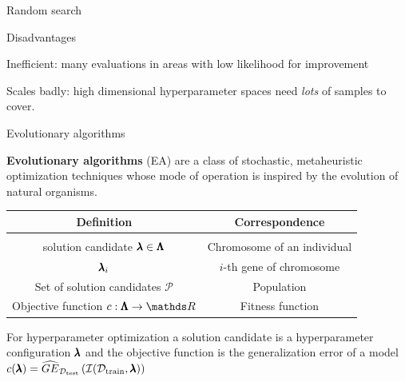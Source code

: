 \begin{frame}{Random search}
\begin{blocki}{Disadvantages}
\item Inefficient: many evaluations in areas with low likelihood for improvement
\item Scales badly: high dimensional hyperparameter spaces need \emph{lots} of samples to cover.
\end{blocki}
\end{frame}





\begin{frame}{Evolutionary algorithms}

\textbf{Evolutionary algorithms} (EA) are a class of stochastic, metaheuristic optimization techniques whose mode of operation is inspired by the evolution of natural organisms.

\vspace{0.5cm}

\begin{center}
\begin{tabular}{ c | c }
\textbf{Definition} & \textbf{Correspondence} \\[0.05cm]
\hline \\[0.01cm]
solution candidate $\pmb{\lambda} \in \pmb{\Lambda}$ & Chromosome of an individual \\[0.1cm]
$\pmb{\lambda}_{i}$& $i$-th gene of chromosome\\[0.1cm]
Set of solution candidates $\mathcal{P}$ & Population \\[0.1cm]
Objective function $\f: \XX \to \R$ & Fitness function
\end{tabular}
\end{center}

For hyperparameter optimization a solution candidate is a hyperparameter configuration $\pmb{\lambda}$ and the objective function is the generalization error of a model $c(\pmb{\lambda}) = \widehat{GE}_{\mathcal{D}_{\text{test}}}\left(\mathcal{I}(\mathcal{D}_{\text{train}}, \pmb{\lambda})\right)$

\end{frame}

